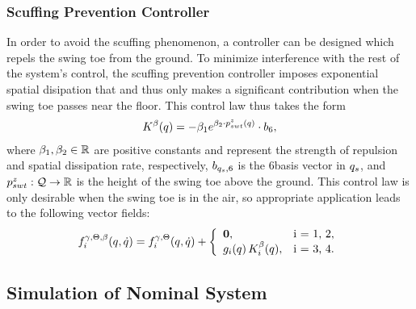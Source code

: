 \subsubsection{Scuffing Prevention Controller}

In order to avoid the scuffing phenomenon, a controller can be designed which
repels the swing toe from the ground.
%
To minimize interference with the rest of the system's control, the scuffing
prevention controller imposes exponential spatial disipation that and thus only
makes a significant contribution when the swing toe passes near the floor.
%
This control law thus takes the form
\begin{align*}
  K^{\beta}(q) = -\beta_{1} e^{\beta_{2} \cdot p_{swt}^z(q)} \cdot b_{6},
\end{align*}
where $\beta_1, \beta_2 \in \mathbb{R}$ are positive constants and represent the strength
of repulsion and spatial dissipation rate, respectively, $b_{q_{s}, 6}$ is the
6\ssth basis vector in $q_{s}$, and $p_{swt}^z : \mathcal{Q} \to \mathbb{R}$ is the height of the
swing toe above the ground.
%
This control law is only desirable when the swing toe is in the air, so
appropriate application leads to the following vector fields:
%
\begin{align*}
  \frigtm\argsqdq = \frigt\argsqdq +
  \left\{
    \begin{array}{l @{\hspace{1em}} l}
      \boldzero, & $i = 1, 2$,\\
      \gri\argsq \, \Krmi\argsq, & $i = 3, 4$.
    \end{array}
  \right.
\end{align*}

\subsection{Simulation of Nominal System}

